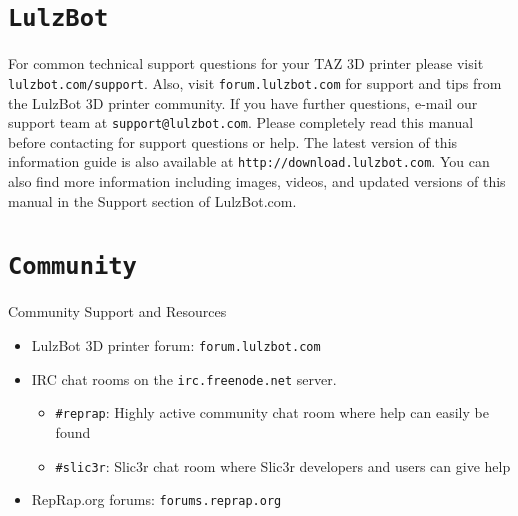 %
%
%
%
%

\section{\texttt{LulzBot}}
\setlength{\parindent}{0pt}
For common technical support questions for your TAZ 3D printer please visit \texttt{lulzbot.com/support}. Also, visit \texttt{forum.lulzbot.com} for support and tips from the LulzBot\textsuperscript{\miniscule{\texttrademark}} 3D printer community. If you have further questions, e-mail our support team at \texttt{support@lulzbot.com}. Please completely read this manual before contacting for support questions or help. The latest version of this information guide is also available at \texttt{http://download.lulzbot.com}. You can also find more information including images, videos, and updated versions of this manual in the Support section of LulzBot.com.

\section{\texttt{Community}}
Community Support and Resources

\begin{itemize}

\item LulzBot\textsuperscript{\miniscule{\texttrademark}} 3D printer forum: \texttt{forum.lulzbot.com}
\item IRC chat rooms on the \texttt{irc.freenode.net} server.
	\begin{itemize}
	\item \texttt{\#reprap}: Highly active community chat room where help can easily be found
	\item \texttt{\#slic3r}: Slic3r chat room where Slic3r developers and users can give help
	\end{itemize}
\item RepRap.org forums: \texttt{forums.reprap.org}

\end{itemize}
